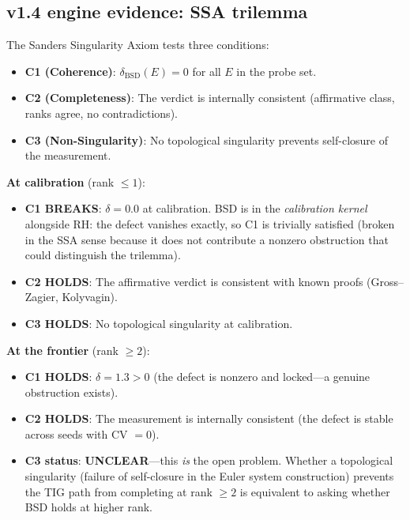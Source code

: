 \documentclass[11pt]{article}
\begin{document}
\subsection{v1.4 engine evidence: SSA trilemma}
\label{sec:ssa-bsd}

The Sanders Singularity Axiom tests three conditions:
\begin{itemize}
  \item \textbf{C1 (Coherence)}: $\delta_{\mathrm{BSD}}(E) = 0$ for all $E$ in
    the probe set.
  \item \textbf{C2 (Completeness)}: The verdict is internally consistent
    (affirmative class, ranks agree, no contradictions).
  \item \textbf{C3 (Non-Singularity)}: No topological singularity prevents
    self-closure of the measurement.
\end{itemize}

\noindent
\textbf{At calibration} (rank $\leq 1$):
\begin{itemize}
  \item \textbf{C1 BREAKS}: $\delta = 0.0$ at calibration.  BSD is in the
    \emph{calibration kernel} alongside RH: the defect vanishes exactly, so
    C1 is trivially satisfied (broken in the SSA sense because it does not
    contribute a nonzero obstruction that could distinguish the trilemma).
  \item \textbf{C2 HOLDS}: The affirmative verdict is consistent with known
    proofs (Gross--Zagier, Kolyvagin).
  \item \textbf{C3 HOLDS}: No topological singularity at calibration.
\end{itemize}

\noindent
\textbf{At the frontier} (rank $\geq 2$):
\begin{itemize}
  \item \textbf{C1 HOLDS}: $\delta = 1.3 > 0$ (the defect is nonzero and
    locked---a genuine obstruction exists).
  \item \textbf{C2 HOLDS}: The measurement is internally consistent (the defect
    is stable across seeds with CV $= 0$).
  \item \textbf{C3 status}: \textbf{UNCLEAR}---this \emph{is} the open problem.
    Whether a topological singularity (failure of self-closure in the Euler
    system construction) prevents the TIG path from completing at rank $\geq 2$
    is equivalent to asking whether BSD holds at higher rank.
\end{itemize}
\end{document}
